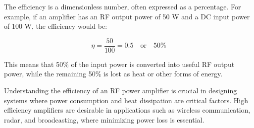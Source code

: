 The efficiency is a dimensionless number, often expressed as a percentage. For example, if an amplifier has an RF output power of 50 W and a DC input power of 100 W, the efficiency would be:

\[
\eta = \frac{50}{100} = 0.5 \quad \text{or} \quad 50\%
\]

This means that 50\% of the input power is converted into useful RF output power, while the remaining 50\% is lost as heat or other forms of energy.

Understanding the efficiency of an RF power amplifier is crucial in designing systems where power consumption and heat dissipation are critical factors. High efficiency amplifiers are desirable in applications such as wireless communication, radar, and broadcasting, where minimizing power loss is essential.

